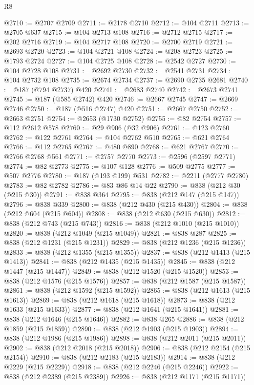 \begin{lexlean}{R8}
\begin{coremodule}
@2710 := @2707 @2709
@2711 := @2178 @2710
@2712 := @104 @2711
@2713 := @2705 @637
@2715 := @104 @2713 @108
@2716 := @2712 @2715
@2717 := @202 @2716
@2719 := @104 @2717 @108
@2720 := @2700 @2719
@2721 := @2693 @2720
@2723 := @104 @2721 @108
@2724 := @208 @2723
@2725 := @1793 @2724
@2727 := @104 @2725 @108
@2728 := @2542 @2727
@2730 := @104 @2728 @108
@2731 := @2692 @2730
@2732 := @2541 @2731
@2734 := @104 @2732 @108
@2735 := @2674 @2734
@2737 := @2690 @2735 @2681
@2740 := @187 (@794 @2737) @420
@2741 := @2683 @2740
@2742 := @2673 @2741
@2745 := @187 (@585 @2742) @420
@2746 := @2667 @2745
@2747 := @2669 @2746
@2750 := @187 (@516 @2747) @420
@2751 := @2667 @2750
@2752 := @2663 @2751
@2754 := @2653 (@1730 @2752)
@2755 := @82 @2754
@2757 := @112 @2612 @578
@2760 := @29 @906 (@32 @906)
@2761 := @123 @2760
@2762 := @122 @2761
@2764 := @104 @2762 @510
@2765 := @621 @2764
@2766 := @112 @2765
@2767 := @480 @890
@2768 := @621 @2767
@2770 := @2766 @2768 @561
@2771 := @2757 @2770
@2773 := @2596 (@2597 @2771)
@2774 := @82 @2773
@2775 := @107 @128
@2776 := @509 @2775
@2777 := @507 @2776
@2780 := @187 (@193 @199) @531
@2782 := @2211 (@2777 @2780)
@2783 := @82 @2782
@2786 := @83 @86 @14 @22
@2790 := @838 (@212 @30 (@215 @30))
@2791 := @838 @364
@2795 := @838 (@212 @147 (@215 @147))
@2796 := @838 @339
@2800 := @838 (@212 @430 (@215 @430))
@2804 := @838 (@212 @604 (@215 @604))
@2808 := @838 (@212 @630 (@215 @630))
@2812 := @838 (@212 @743 (@215 @743))
@2816 := @838 (@212 @1010 (@215 @1010))
@2820 := @838 (@212 @1049 (@215 @1049))
@2821 := @838 @287
@2825 := @838 (@212 @1231 (@215 @1231))
@2829 := @838 (@212 @1236 (@215 @1236))
@2833 := @838 (@212 @1355 (@215 @1355))
@2837 := @838 (@212 @1413 (@215 @1413))
@2841 := @838 (@212 @1435 (@215 @1435))
@2845 := @838 (@212 @1447 (@215 @1447))
@2849 := @838 (@212 @1520 (@215 @1520))
@2853 := @838 (@212 @1576 (@215 @1576))
@2857 := @838 (@212 @1587 (@215 @1587))
@2861 := @838 (@212 @1592 (@215 @1592))
@2865 := @838 (@212 @1613 (@215 @1613))
@2869 := @838 (@212 @1618 (@215 @1618))
@2873 := @838 (@212 @1633 (@215 @1633))
@2877 := @838 (@212 @1641 (@215 @1641))
@2881 := @838 (@212 @1646 (@215 @1646))
@2882 := @838 @265
@2886 := @838 (@212 @1859 (@215 @1859))
@2890 := @838 (@212 @1903 (@215 @1903))
@2894 := @838 (@212 @1986 (@215 @1986))
@2898 := @838 (@212 @2011 (@215 @2011))
@2902 := @838 (@212 @2018 (@215 @2018))
@2906 := @838 (@212 @2154 (@215 @2154))
@2910 := @838 (@212 @2183 (@215 @2183))
@2914 := @838 (@212 @2229 (@215 @2229))
@2918 := @838 (@212 @2246 (@215 @2246))
@2922 := @838 (@212 @2389 (@215 @2389))
@2926 := @838 (@212 @1171 (@215 @1171))

\end{coremodule}
\end{lexlean}
